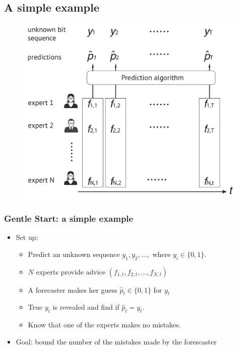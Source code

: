 \documentclass{beamer}
\begin{document}
\subsection{A simple example}
\begin{frame}
\begin{figure}
\includegraphics[scale = 0.35]{figures/expert_problem.pdf}
\end{figure}

\end{frame}





\begin{frame}
\frametitle{Gentle Start: a simple example}
\begin{itemize}
\item Set up:
\begin{itemize}
\item Predict an unknown sequence $y_1, y_2, \ldots,$ where $y_i\in\{0,1\}.$
\item $N$ experts provide advice $(f_{1,t},f_{2,t},\ldots, f_{N,t})$
\item A forecaster makes her guess $\hat{p}_t\in\{0,1\}$ for $y_t$ 
\item True $y_t$ is revealed and find if $\hat{p}_t = y_t$. 
\item {\color{red}Know that one of the experts makes no mistakes.}
\end{itemize}
\item Goal: bound the number of the mistakes made by the forescaster
\end{itemize}
\end{frame}
\end{document}
